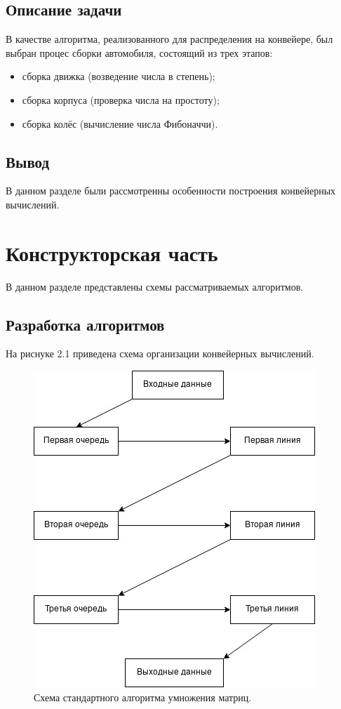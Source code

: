 \documentclass[12pt]{report}
\begin{document}
\section{Описание задачи}

В качестве алгоритма, реализованного для распределения на конвейере, был выбран процес сборки автомобиля, состоящий из трех этапов:

\begin{itemize}
	\item сборка движка (возведение числа в степень);
	\item сборка корпуса (проверка числа на простоту);
	\item сборка колёс (вычисление числа Фибоначчи).
\end{itemize}

\section*{Вывод}
	В данном разделе были рассмотренны особенности построения конвейерных вычислений.
\clearpage

\chapter{Конструкторская часть}

В данном разделе представлены схемы рассматриваемых алгоритмов.

\section{Разработка алгоритмов}

На риснуке 2.1 приведена схема организации конвейерных вычислений.

\begin{figure}[h]
	\centering
	\includegraphics[scale=0.6]{scheme_lab05.jpg}
	\caption{Схема стандартного алгоритма умножения матриц.}
	\label{fig:mpr}
\end{figure}
\end{document}
